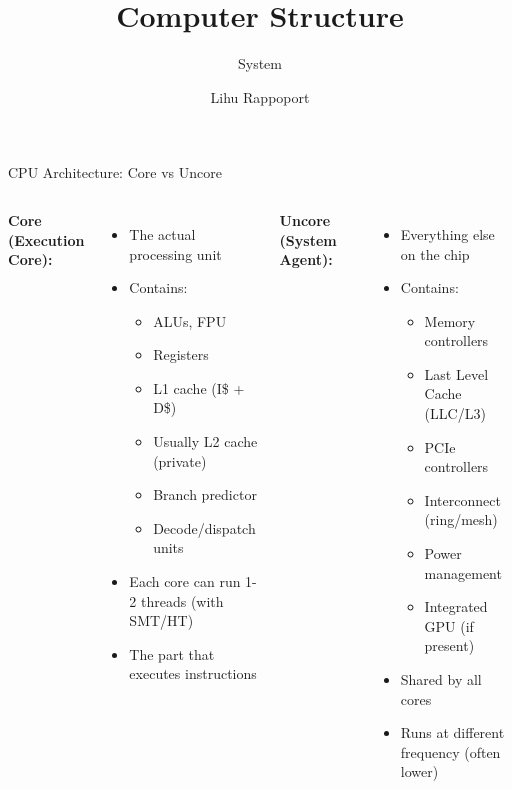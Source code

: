\documentclass[aspectratio=169,12pt]{beamer}
\title{Computer Structure}
\subtitle{System}
\author{Lihu Rappoport}
\date{}
\begin{document}
\frame{\titlepage}

\begin{frame}{CPU Architecture: Core vs Uncore}
\begin{columns}[T]
\textbf{Core (Execution Core):}
\begin{itemize}
\item The actual processing unit
\item Contains:
  \begin{itemize}
  \item ALUs, FPU
  \item Registers
  \item L1 cache (I\$ + D\$)
  \item Usually L2 cache (private)
  \item Branch predictor
  \item Decode/dispatch units
  \end{itemize}
\item Each core can run 1-2 threads (with SMT/HT)
\item The part that executes instructions
\end{itemize}

\textbf{Uncore (System Agent):}
\begin{itemize}
\item Everything else on the chip
\item Contains:
  \begin{itemize}
  \item Memory controllers
  \item Last Level Cache (LLC/L3)
  \item PCIe controllers
  \item Interconnect (ring/mesh)
  \item Power management
  \item Integrated GPU (if present)
  \end{itemize}
\item Shared by all cores
\item Runs at different frequency (often lower)
\end{itemize}
\end{columns}

\vspace{0.3cm}
\begin{center}
\end{center}
\end{frame}
\end{document}
